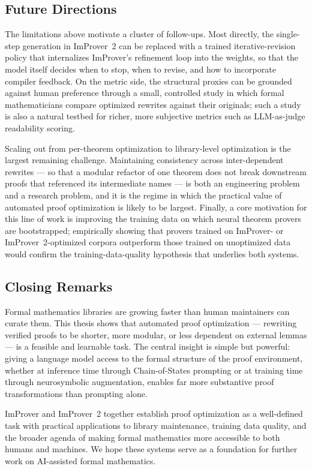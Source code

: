 \subsection{Future Directions}

The limitations above motivate a cluster of follow-ups. Most directly, the single-step generation in ImProver~2 can be replaced with a trained iterative-revision policy that internalizes ImProver's refinement loop into the weights, so that the model itself decides when to stop, when to revise, and how to incorporate compiler feedback. On the metric side, the structural proxies can be grounded against human preference through a small, controlled study in which formal mathematicians compare optimized rewrites against their originals; such a study is also a natural testbed for richer, more subjective metrics such as LLM-as-judge readability scoring.


Scaling out from per-theorem optimization to library-level optimization is the largest remaining challenge. Maintaining consistency across inter-dependent rewrites --- so that a modular refactor of one theorem does not break downstream proofs that referenced its intermediate names --- is both an engineering problem and a research problem, and it is the regime in which the practical value of automated proof optimization is likely to be largest. Finally, a core motivation for this line of work is improving the training data on which neural theorem provers are bootstrapped; empirically showing that provers trained on ImProver- or ImProver~2-optimized corpora outperform those trained on unoptimized data would confirm the training-data-quality hypothesis that underlies both systems.

\subsection{Closing Remarks}

Formal mathematics libraries are growing faster than human maintainers can curate them. This thesis shows that automated proof optimization --- rewriting verified proofs to be shorter, more modular, or less dependent on external lemmas --- is a feasible and learnable task. The central insight is simple but powerful: giving a language model access to the formal structure of the proof environment, whether at inference time through Chain-of-States prompting or at training time through neurosymbolic augmentation, enables far more substantive proof transformations than prompting alone.

ImProver and ImProver~2 together establish proof optimization as a well-defined task with practical applications to library maintenance, training data quality, and the broader agenda of making formal mathematics more accessible to both humans and machines. We hope these systems serve as a foundation for further work on AI-assisted formal mathematics.
